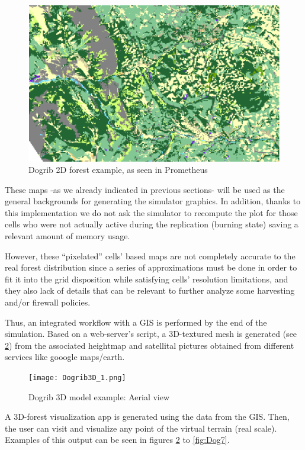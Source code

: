 \documentclass[11pt]{article}
\begin{document}
\begin{figure}[h!]
\centering
\includegraphics[scale=1.0]{Dogrib2D.png}
\caption{\label{fig:Dog2d}Dogrib 2D forest example, as seen in Prometheus}
\end{figure}

These maps -as we already indicated in previous sections- will be used as the general backgrounds for generating the simulator graphics. In addition, thanks to this implementation we do not ask the simulator to recompute the plot for those cells who were not actually active during the replication (burning state) saving a relevant amount of memory usage.

However, these ``pixelated'' cells' based maps are not completely accurate to the real forest distribution since a series of approximations must be done in order to fit it into the grid disposition while satisfying cells' resolution limitations, and they also lack of details that can be relevant to further analyze some harvesting and/or firewall policies.

Thus, an integrated workflow with a GIS is performed by the end of the simulation. Based on a web-server's script, a 3D-textured mesh is generated (see \ref{fig:Dog1}) from the associated heightmap and satellital pictures obtained from different services like gooogle maps/earth.

\begin{figure}[h!]
\centering
\texttt{[image: Dogrib3D\_1.png]}
\caption{\label{fig:Dog1}Dogrib 3D model example: Aerial view}
\end{figure}

A 3D-forest visualization app is generated using the data from the GIS. Then, the user can visit and visualize any point of the virtual terrain (real scale). Examples of this output can be seen in figures \ref{fig:Dog1} to \ref{fig:Dog7}.
\end{document}
